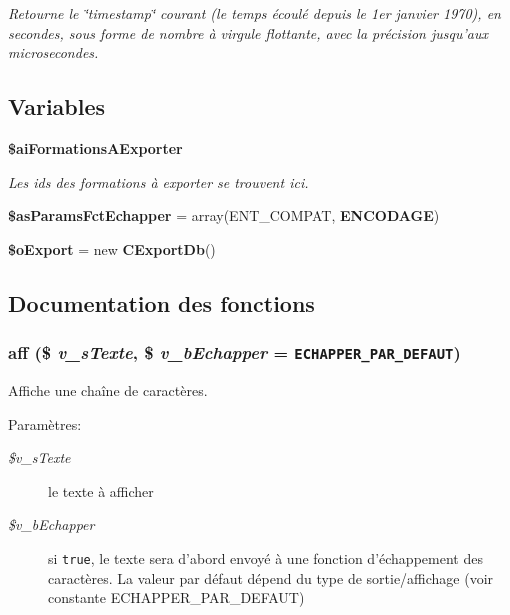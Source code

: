 \begin{CompactItemize}
\begin{CompactList}\small\item\em Retourne le \char`\"{}timestamp\char`\"{} courant (le temps écoulé depuis le 1er janvier 1970), en secondes, sous forme de nombre à virgule flottante, avec la précision jusqu'aux microsecondes. \item\end{CompactList}\end{CompactItemize}
\subsection*{Variables}
\begin{CompactItemize}
\item 
{\bf \$aiFormationsAExporter}
\begin{CompactList}\small\item\em Les ids des formations à exporter se trouvent ici. \item\end{CompactList}\item 
\textbf{\$asParamsFctEchapper} = array(ENT\_\-COMPAT, {\bf ENCODAGE})\label{export_8php_4f9e52578c04c80cb3a515dc2d96dbef}

\item 
\textbf{\$oExport} = new {\bf CExportDb}()\label{export_8php_f0a30f3cb5b0e8fa48607c62e8dbb307}

\end{CompactItemize}


\subsection{Documentation des fonctions}
\subsubsection{\setlength{\rightskip}{0pt plus 5cm}aff (\$ {\em v\_\-sTexte}, \/  \$ {\em v\_\-bEchapper} = {\tt ECHAPPER\_\-PAR\_\-DEFAUT})}\label{export_8php_8b3deed01230979dd4dab173b6c92ef8}


Affiche une chaîne de caractères. 

\begin{Desc}
\item[Paramètres:]
\begin{description}
\item[{\em \$v\_\-sTexte}]le texte à afficher \item[{\em \$v\_\-bEchapper}]si {\tt true}, le texte sera d'abord envoyé à une fonction d'échappement des caractères. La valeur par défaut dépend du type de sortie/affichage (voir constante ECHAPPER\_\-PAR\_\-DEFAUT) \end{description}
\end{Desc}


